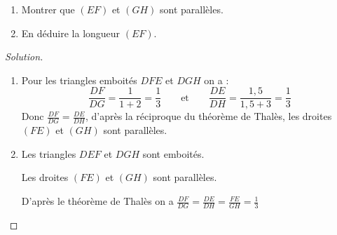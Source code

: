 \documentclass[main.tex]{subfiles}
\begin{document}
\begin{example} \hfill
	\begin{enumerate}
		\item Montrer que $(EF)$ et $(GH)$ sont parallèles.
		\item En déduire la longueur $(EF)$.
	\end{enumerate}
\end{example}
\begin{proof}[Solution]\hfill 
	\begin{enumerate}
		\item Pour les triangles emboités $DFE$ et $DGH$ on a :
		$$
		\frac{DF}{DG} = \frac{1}{1+2}=\frac{1}{3}
		\qquad \text{et}\qquad 
		\frac{DE}{DH} = \frac{1,5}{1,5+3}=\frac{1}{3}
		$$
		Donc $\frac{DF}{DG} =\frac{DE}{DH}$, d'après la réciproque du théorème de Thalès, les droites $(FE)$ et $(GH)$ sont parallèles.
		\item Les triangles $DEF$ et $DGH$ sont emboités.
		
		Les droites $(FE)$ et $(GH)$ sont parallèles.
		
		D'après le théorème de Thalès on a  $\frac{DF}{DG}=\frac{DE}{DH}=\frac{FE}{GH} = \frac{1}{3}$  
	\end{enumerate} 
\end{proof} 
\end{document}
